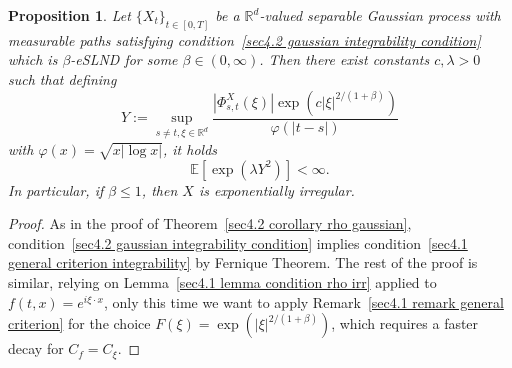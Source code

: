\documentclass[10pt]{article}
\newcommand{\assign}{:=}
\newtheorem{proposition}[theorem]{Proposition}
\begin{document}
\begin{proposition}
  \label{sec4.2 prop exp irr}Let $\{X_t\}_{t\in [0,T]}$ be a $\mathbb{R}^d$-valued
  separable Gaussian process with measurable paths satisfying
  condition~\eqref{sec4.2 gaussian integrability condition} which is
  $\beta$\mbox{-}eSLND for some $\beta\in (0,\infty)$. Then there exist constants $c, \lambda > 0$ such that
  defining
  \[ Y \assign \sup_{s \neq t, \xi \in \mathbb{R}^d} \frac{| \Phi^X_{s, t}
     (\xi) | \exp (c | \xi |^{2 / (1 + \beta)})}{\varphi (| t - s |)} \]
  with $\varphi (x) = \sqrt{x | \log x |}$, it holds
  \[ \mathbb{E} [\exp (\lambda Y^2)] < \infty . \]
  In particular, if $\beta \leqslant 1$, then $X$ is exponentially irregular.
\end{proposition}

\begin{proof}
  As in the proof of Theorem~\ref{sec4.2 corollary rho gaussian},
  condition~\eqref{sec4.2 gaussian integrability condition} implies
  condition~\eqref{sec4.1 general criterion integrability} by Fernique
  Theorem. The rest of the proof is similar, relying on Lemma~\ref{sec4.1
  lemma condition rho irr} applied to $f (t, x) = e^{i \xi \cdot x}$, only
  this time we want to apply Remark~\ref{sec4.1 remark general criterion} for
  the choice $F (\xi) = \exp (| \xi |^{2 / (1 + \beta)})$, which requires a faster
  decay for $C_f = C_{\xi}$.
  

\end{proof}
\end{document}
